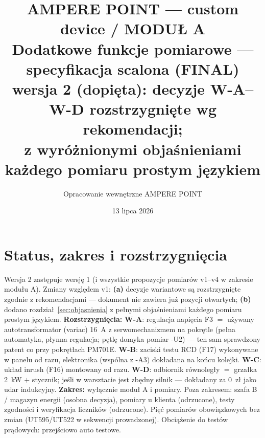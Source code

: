 \documentclass[11pt,a4paper]{article}
\title{\textbf{AMPERE POINT --- custom device / MODUŁ A}\\[4pt]
\large Dodatkowe funkcje pomiarowe --- specyfikacja scalona (FINAL)\\[2pt]
\normalsize wersja 2 (dopięta): decyzje W-A--W-D rozstrzygnięte wg rekomendacji;\\
z wyróżnionymi objaśnieniami każdego pomiaru prostym językiem}
\author{Opracowanie wewnętrzne AMPERE POINT}
\date{13 lipca 2026}
\begin{document}
\maketitle
\vspace{-1.4em}
\tableofcontents

\section{Status, zakres i rozstrzygnięcia}
Wersja 2 zastępuje wersję 1 (i wszystkie propozycje pomiarów v1--v4 w zakresie modułu A).
Zmiany względem v1: \textbf{(a)} decyzje wariantowe są rozstrzygnięte zgodnie z rekomendacjami
--- dokument nie zawiera już pozycji otwartych; \textbf{(b)} dodano rozdział~\ref{sec:objasnienia}
z pełnymi objaśnieniami każdego pomiaru prostym językiem.
\textbf{Rozstrzygnięcia:} \textbf{W-A}: regulacja napięcia F3 $=$ używany autotransformator
(variac) 16~A z serwomechanizmem na pokrętle (pełna automatyka, płynna regulacja; pętlę domyka
pomiar -U2) --- ten sam sprawdzony patent co przy pokrętłach PM701E. \textbf{W-B}: zaciski testu
RCD (F17) wykonywane w panelu od razu, elektronika (wspólna z -A3) dokładana na końcu kolejki.
\textbf{W-C}: układ inrush (F16) montowany od razu. \textbf{W-D}: odbiornik równoległy $=$
grzałka 2~kW $+$ stycznik; jeśli w warsztacie jest zbędny silnik --- dokładany za 0~zł jako udar
indukcyjny.
\textbf{Zakres:} wyłącznie moduł A i pomiary. Poza zakresem: szafa B / magazyn energii (osobna
decyzja), pomiary u klienta (odrzucone), testy zgodności i weryfikacja liczników (odrzucone).
Pięć pomiarów obowiązkowych bez zmian (UT595/UT522 w sekwencji prowadzonej). Obciążenie do
testów prądowych: przejściowo auto testowe.
\end{document}
